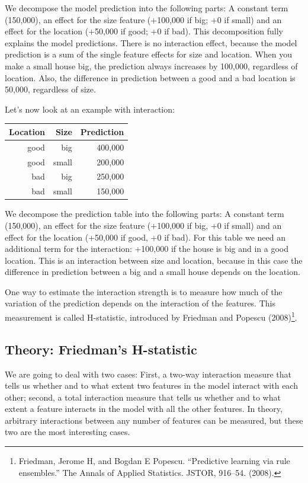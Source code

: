 \documentclass[
  12pt,
]{krantz}
\begin{document}
We decompose the model prediction into the following parts:
A constant term (150,000), an effect for the size feature (+100,000 if big; +0 if small) and an effect for the location (+50,000 if good; +0 if bad).
This decomposition fully explains the model predictions.
There is no interaction effect, because the model prediction is a sum of the single feature effects for size and location.
When you make a small house big, the prediction always increases by 100,000, regardless of location.
Also, the difference in prediction between a good and a bad location is 50,000, regardless of size.

Let's now look at an example with interaction:

\begin{longtable}[]{@{}rrr@{}}
\toprule
Location & Size & Prediction\tabularnewline
\midrule
\endhead
good & big & 400,000\tabularnewline
good & small & 200,000\tabularnewline
bad & big & 250,000\tabularnewline
bad & small & 150,000\tabularnewline
\bottomrule
\end{longtable}

We decompose the prediction table into the following parts:
A constant term (150,000), an effect for the size feature (+100,000 if big, +0 if small) and an effect for the location (+50,000 if good, +0 if bad).
For this table we need an additional term for the interaction: +100,000 if the house is big and in a good location.
This is an interaction between size and location, because in this case the difference in prediction between a big and a small house depends on the location.

One way to estimate the interaction strength is to measure how much of the variation of the prediction depends on the interaction of the features.
This measurement is called H-statistic, introduced by Friedman and Popescu (2008)\footnote{Friedman, Jerome H, and Bogdan E Popescu. ``Predictive learning via rule ensembles.'' The Annals of Applied Statistics. JSTOR, 916--54. (2008).}.

\hypertarget{theory-friedmans-h-statistic}{%
\subsection{Theory: Friedman's H-statistic}\label{theory-friedmans-h-statistic}}

We are going to deal with two cases:
First, a two-way interaction measure that tells us whether and to what extent two features in the model interact with each other;
second, a total interaction measure that tells us whether and to what extent a feature interacts in the model with all the other features.
In theory, arbitrary interactions between any number of features can be measured, but these two are the most interesting cases.
\end{document}
